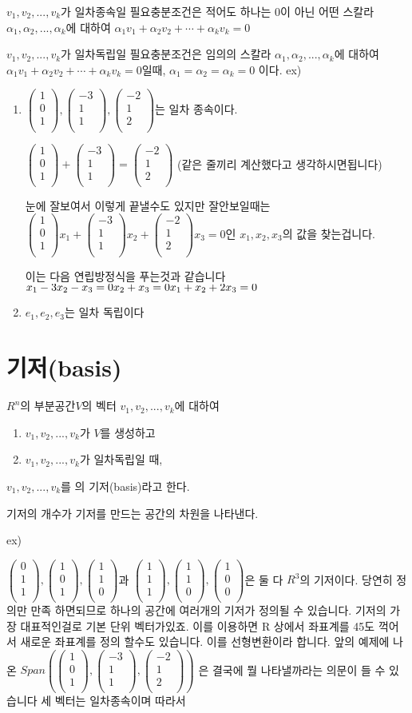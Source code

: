 \documentclass{oblivoir}
\newcommand{\onetok}[1]{ {#1}_1, {#1}_2, ... , {#1}_k}
\newcommand{\sumtok}[2]{  {#1}_1{#2}_1 + {#1}_2{#2}_2 + \cdots + {#1}_k{#2}_k}
\newcommand{\cvecthree}[3]{ \begin{pmatrix}    {#1} \\    {#2} \\    {#3} \\ \end{pmatrix}}
\begin{document}
$\onetok{v}$가 일차종속일 필요충분조건은 적어도 하나는 0이 아닌 어떤 스칼라  $\onetok{\alpha}$에 대하여  $\sumtok{\alpha}{v} = 0$

$\onetok{v}$가 일차독립일 필요충분조건은 임의의 스칼라 $\onetok{\alpha}$에 대하여 $\sumtok{\alpha}{v} = 0$일때, $\alpha_1 = \alpha_2 = \alpha_k = 0$ 이다.
ex)
\begin{enumerate}
    
\item  $\cvecthree{1}{0}{1},\cvecthree{-3}{1}{1},\cvecthree{-2}{1}{2}$는 일차 종속이다.

$\cvecthree{1}{0}{1} + \cvecthree{-3}{1}{1} = \cvecthree{-2}{1}{2}$ (같은 줄끼리 계산했다고 생각하시면됩니다)

눈에 잘보여서 이렇게 끝낼수도 있지만 잘안보일때는
$\cvecthree{1}{0}{1}x_1 + \cvecthree{-3}{1}{1}x_2 + \cvecthree{-2}{1}{2}x_3 = 0$인  $x_1, x_2, x_3$의 값을 찾는겁니다.

이는 다음 연립방정식을 푸는것과 같습니다\\
$
x_1 -3x_2-x_3=0 \\
x_2 + x_3 = 0 \\
x_1 + x_2 + 2x_3 = 0
$ 

\item $e_1, e_2, e_3$는 일차 독립이다

\end{enumerate}

\section{기저(basis)}
\begin{dfn}[기저]
    
$R^n$의 부분공간$V$의 벡터 $\onetok{v}$에 대하여
\begin{enumerate}
    \item $\onetok{v}$가 $V$를 생성하고
    \item $\onetok{v}$가 일차독립일 때,
\end{enumerate}
$\onetok{v}$를 의 기저(basis)라고 한다.
\end{dfn}

기저의 개수가 기저를 만드는 공간의 차원을 나타낸다.

ex)

$\cvecthree{0}{1}{1},\cvecthree{1}{0}{1},\cvecthree{1}{1}{0}$과 $\cvecthree{1}{1}{1}, \cvecthree{1}{1}{0}, \cvecthree{1}{0}{0}$은 둘 다 $R^3$의 기저이다.
당연히 정의만 만족 하면되므로 하나의 공간에 여러개의 기저가 정의될 수 있습니다.
기저의 가장 대표적인걸로 기본 단위 벡터가있죠.
이를 이용하면 R 상에서 좌표계를 45도 꺽어서 새로운 좌표계를 정의 할수도 있습니다. 이를 선형변환이라 합니다.
앞의 예제에 나온
$Span(\cvecthree{1}{0}{1},\cvecthree{-3}{1}{1},\cvecthree{-2}{1}{2})$
은 결국에 뭘 나타낼까라는 의문이 들 수 있습니다
세 벡터는 일차종속이며 따라서 
\end{document}
